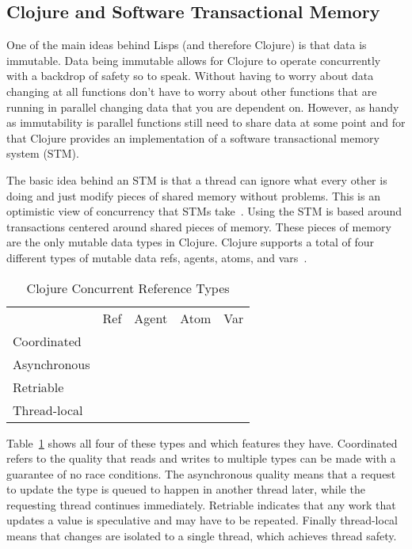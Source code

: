 \documentclass{acm_proc_article-sp}
\begin{document}
	\subsection{Clojure and Software Transactional Memory}
	One of the main ideas behind Lisps (and therefore Clojure) is that data is immutable. Data being immutable allows for Clojure to operate concurrently with a backdrop of safety so to speak. Without having to worry about data changing at all functions don't have to worry about other functions that are running in parallel changing data that you are dependent on. However, as handy as immutability is parallel functions still need to share data at some point and for that Clojure provides an implementation of a software transactional memory system (STM).
	
	The basic idea behind an STM is that a thread can ignore what every other is doing and just modify pieces of shared memory without problems. This is an optimistic view of concurrency that STMs take~\cite{wiki:stm}. Using the STM is based around transactions centered around shared pieces of memory. These pieces of memory are the only mutable data types in Clojure. Clojure supports a total of four different types of mutable data refs, agents, atoms, and vars~\cite{joy}.
	
	\begin{table}[b]
	\caption{Clojure Concurrent Reference Types\label{types:table}}	
	\begin{tabular}{ | l | c | c | c | c | }
	\hline
	& Ref & Agent & Atom & Var\\
	Coordinated & \checkmark & & &\\
	Asynchronous & & \checkmark & &\\
	Retriable & \checkmark & & \checkmark &\\
	Thread-local & & & & \checkmark\\
	\hline
	\end{tabular}
	\end{table}
	
	Table~\ref{types:table} shows all four of these types and which features they have. Coordinated refers to the quality that reads and writes to multiple types can be made with a guarantee of no race conditions. The asynchronous quality means that a request to update the type is queued to happen in another thread later, while the requesting thread continues immediately. Retriable indicates that any work that updates a value is speculative and may have to be repeated. Finally thread-local means that changes are isolated to a single thread, which achieves thread safety.
	
\end{document}

